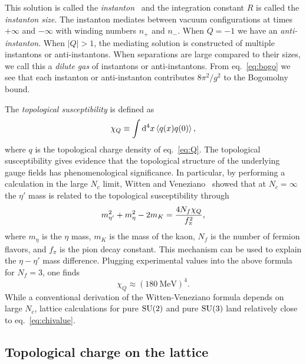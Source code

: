 This solution is called the {\it instanton}~\cite{belavin_pseudoparticle_1975}
and the integration constant $R$ is called the 
{\it instanton size}. 
The instanton mediates between vacuum configurations at times
$+\infty$ and $-\infty$ with winding numbers $n_+$ and $n_-$.
When $Q=-1$ we have an {\it anti-instanton}.
When $|Q|>1$, the mediating solution is constructed of multiple 
instantons or anti-instantons. When separations are large compared
to their sizes, we call this a {\it dilute gas} of instantons
or anti-instantons. From eq.~\eqref{eq:bogo}
we see that each instanton or anti-instanton contributes
$8\pi^2/g^2$ to the Bogomolny bound.

The {\it topological susceptibility} is defined as
\begin{equation}
  \chi_Q\equiv\int\dd[4]{x}\ev{q(x)q(0)},
\end{equation}
where $q$ is the topological charge density of eq.~\eqref{eq:Q}.
The topological susceptibility gives evidence that the topological
structure of the underlying gauge fields has phenomenological significance.
In particular, by performing a calculation in the large $N_c$ limit, 
Witten and Veneziano~\cite{witten_current_1979,veneziano_u1_1979} showed
that at $N_c=\infty$ the $\eta'$ mass is related to 
the topological susceptibility through
\begin{equation}\index{Witten-Veneziano formula}
  m_{\eta'}^2+m_\eta^2-2m_K=\frac{4N_f\chi_Q}{f_\pi^2},
\end{equation}
where $m_\eta$ is the $\eta$ mass, $m_K$ is the mass of the kaon, 
$N_f$ is the number of fermion flavors, and $f_\pi$ is the
pion decay constant. This mechanism can be used to explain the 
$\eta-\eta'$ mass difference. 
Plugging experimental values into the above
formula for $N_f=3$, one finds
\begin{equation}\label{eq:chivalue}
  \chi_Q\approx(180~\text{MeV})^4.
\end{equation}
While a conventional derivation of the Witten-Veneziano formula depends
on large $N_c$, lattice calculations for pure $\operatorname{SU}(2)$ and
pure $\operatorname{SU}(3)$ land relatively close to eq.~\eqref{eq:chivalue}.

\subsection{Topological charge on the lattice}

